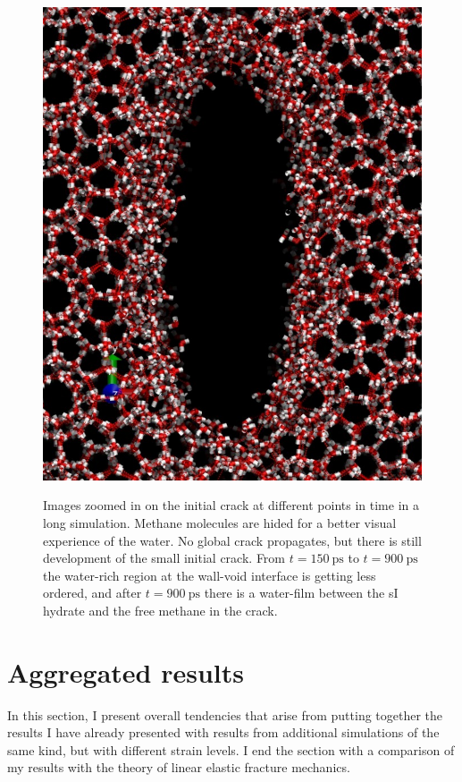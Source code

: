 \begin{figure}
\begin{minipage}[b]{0.24\linewidth}
{\includegraphics[width=\linewidth]{../pictures/snapshots_1045_280K/t_900000.pdf}}
\end{minipage}
\caption{Images zoomed in on the initial crack at different points in time in a long simulation. Methane molecules are hided for a better visual experience of the water. No global crack propagates, but there is still development of the small initial crack. From $t= \SI{150}{\pico\second}$ to $t=\SI{900}{\pico\second}$ the water-rich region at the wall-void interface is getting less ordered, and after $t=\SI{900}{\pico\second}$ there is a water-film between the sI hydrate and the free methane in the crack.}
\label{fig:crack_no_propagate_long_time_snapshots}
\end{figure}

\section{Aggregated results}
In this section, I present overall tendencies that arise from putting together the results I have already presented with results from additional simulations of the same kind, but with different strain levels. I end the section with a comparison of my results with the theory of linear elastic fracture mechanics.

